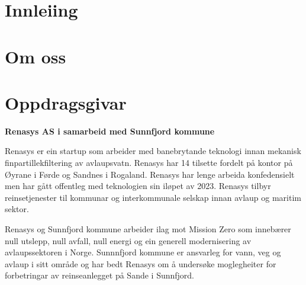 \section{Innleiing}
\thispagestyle{fancy}

\section{Om oss}




\section{Oppdragsgivar}
\textbf{Renasys AS i samarbeid med Sunnfjord kommune}

Renasys er ein startup som arbeider med banebrytande teknologi innan mekanisk finpartillekfiltering av avlaupsvatn.
Renasys har 14 tilsette fordelt på kontor på Øyrane i Førde og Sandnes i Rogaland. Renasys har lenge arbeida konfedensielt men har gått offentleg med teknologien sin iløpet av 2023. Renasys tilbyr reinsetjenester til kommunar og interkommunale selskap innan avlaup og maritim sektor.

Renasys og Sunnfjord kommune arbeider ilag mot Mission Zero som innebærer null utslepp, null avfall, null energi og ein generell modernisering av avlaupssektoren i Norge.
Sunnnfjord kommune er ansvarleg for vann, veg og avlaup i sitt område og har bedt Renasys om å undersøke moglegheiter for forbetringar av reinseanlegget på Sande i Sunnfjord.